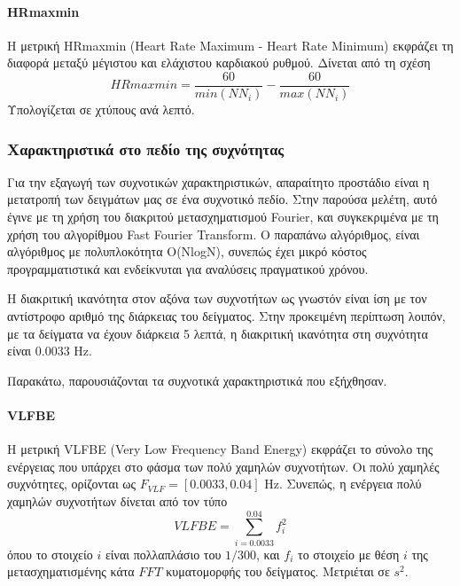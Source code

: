 \paragraph{HRmaxmin}
Η μετρική HRmaxmin (Heart Rate Maximum - Heart Rate Minimum) εκφράζει τη διαφορά μεταξύ μέγιστου και ελάχιστου καρδιακού ρυθμού. Δίνεται από τη σχέση
\begin{equation}
\label{eq:hrmaxmin}
   HRmaxmin = \frac{60}{min(NN_i)} - \frac{60}{max(NN_i)}
\end{equation}
Υπολογίζεται σε χτύπους ανά λεπτό.

\subsubsection{Χαρακτηριστικά στο πεδίο της συχνότητας}
Για την εξαγωγή των συχνοτικών χαρακτηριστικών, απαραίτητο προστάδιο είναι η μετατροπή των δειγμάτων μας σε ένα συχνοτικό πεδίο. Στην παρούσα μελέτη, αυτό έγινε με τη χρήση του διακριτού μετασχηματισμού Fourier\cite{wikiDFT}, και συγκεκριμένα με τη χρήση του αλγορίθμου Fast Fourier Transform. \cite{wikiFFT} Ο παραπάνω αλγόριθμος, είναι αλγόριθμος με πολυπλοκότητα O(NlogN), συνεπώς έχει μικρό κόστος προγραμματιστικά και ενδείκνυται για αναλύσεις πραγματικού χρόνου.

Η διακριτική ικανότητα στον αξόνα των συχνοτήτων ως γνωστόν είναι ίση με τον αντίστροφο αριθμό της διάρκειας του δείγματος. Στην προκειμένη περίπτωση λοιπόν, με τα δείγματα να έχουν διάρκεια 5 λεπτά, η διακριτική ικανότητα στη συχνότητα είναι 0.0033 Hz.

Παρακάτω, παρουσιάζονται τα συχνοτικά χαρακτηριστικά που εξήχθησαν.


\paragraph{VLFBE}
Η μετρική VLFBE (Very Low Frequency Band Energy) εκφράζει το σύνολο της ενέργειας που υπάρχει στο φάσμα των πολύ χαμηλών συχνοτήτων. Οι πολύ χαμηλές συχνότητες, ορίζονται ως $F_{VLF} = [0.0033, 0.04]$ Hz. Συνεπώς, η ενέργεια πολύ χαμηλών συχνοτήτων δίνεται από τον τύπο
\begin{equation}
\label{eq:vlfbe}
   VLFBE = \sum_{i=0.0033}^{0.04}f_i^2
\end{equation}
όπου το στοιχείο $i$ είναι πολλαπλάσιο του $1/300$, και $f_i$ το στοιχείο με θέση $i$ της μετασχηματισμένης κάτα $FFT$ κυματομορφής του δείγματος. Μετριέται σε $s^2$.

